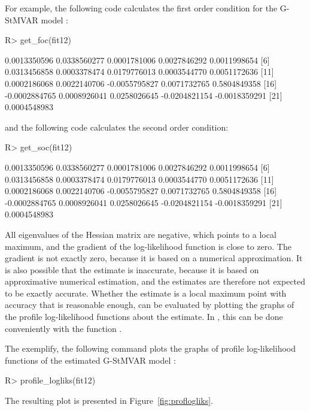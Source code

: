 \documentclass[nojss]{jss}
\begin{document}
For example, the following code calculates the first order condition for the G-StMVAR model :
%
\begin{CodeChunk}
\begin{CodeInput}
R> get_foc(fit12)
\end{CodeInput}
\begin{CodeOutput}
 [1]  0.0013350596  0.0338560277  0.0001781006  0.0027846292  0.0011998654
 [6]  0.0313456858  0.0003378474  0.0179776013  0.0003544770  0.0051172636
[11]  0.0002186068  0.0022140706 -0.0055795827  0.0071732765  0.5804849358
[16] -0.0002884765  0.0008926041  0.0258026645 -0.0204821154 -0.0018359291
[21]  0.0004548983
\end{CodeOutput}
\end{CodeChunk}
%
and the following code calculates the second order condition:
%
\begin{CodeChunk}
\begin{CodeInput}
R> get_soc(fit12)
\end{CodeInput}
\begin{CodeOutput}
 [1]  0.0013350596  0.0338560277  0.0001781006  0.0027846292  0.0011998654
 [6]  0.0313456858  0.0003378474  0.0179776013  0.0003544770  0.0051172636
[11]  0.0002186068  0.0022140706 -0.0055795827  0.0071732765  0.5804849358
[16] -0.0002884765  0.0008926041  0.0258026645 -0.0204821154 -0.0018359291
[21]  0.0004548983
\end{CodeOutput}
\end{CodeChunk}
%
All eigenvalues of the Hessian matrix are negative, which points to a local maximum, and the gradient of the log-likelihood function is close to zero. The gradient is not exactly zero, because it is based on a numerical approximation. It is also possible that the estimate is inaccurate, because it is based on approximative numerical estimation, and the estimates are therefore not expected to be exactly accurate. Whether the estimate is a local maximum point with accuracy that is reasonable enough, can be evaluated by plotting the graphs of the profile log-likelihood functions about the estimate. In , this can be done conveniently with the function .

The exemplify, the following command plots the graphs of profile log-likelihood functions of the estimated G-StMVAR model :
%
\begin{CodeChunk}
\begin{CodeInput}
R> profile_logliks(fit12)
\end{CodeInput}
\end{CodeChunk}
%
The resulting plot is presented in Figure~\ref{fig:proflogliks}.
\end{document}
